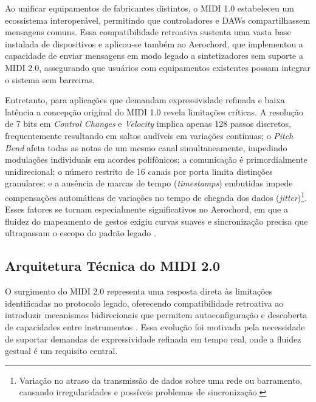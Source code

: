 Ao unificar equipamentos de fabricantes distintos, o MIDI 1.0 estabeleceu um ecossistema interoperável, permitindo que controladores e DAWs compartilhassem mensagens comuns. Essa compatibilidade retroativa sustenta uma vasta base instalada de dispositivos e aplicou-se também ao Aerochord, que implementou a capacidade de enviar mensagens em modo legado a sintetizadores sem suporte a MIDI 2.0, assegurando que usuários com equipamentos existentes possam integrar o sistema sem barreiras.

Entretanto, para aplicações que demandam expressividade refinada e baixa latência a concepção original do MIDI 1.0 revela limitações críticas. A resolução de 7 bits em \textit{Control Changes} e \textit{Velocity} implica apenas 128 passos discretos, frequentemente resultando em saltos audíveis em variações contínuas; o \textit{Pitch Bend} afeta todas as notas de um mesmo canal simultaneamente, impedindo modulações individuais em acordes polifônicos; a comunicação é primordialmente unidirecional; o número restrito de 16 canais por porta limita distinções granulares; e a ausência de marcas de tempo (\textit{timestamps}) embutidas impede compensações automáticas de variações no tempo de chegada dos dados (\textit{jitter})\footnote{Variação no atraso da transmissão de dados sobre uma rede ou barramento, causando irregularidades e possíveis problemas de sincronização.}. Esses fatores se tornam especialmente significativos no Aerochord, em que a fluidez do mapeamento de gestos exigiu curvas suaves e sincronização precisa que ultrapassam o escopo do padrão legado \cite{MIDI2Overview2023}.

\subsection{Arquitetura Técnica do MIDI 2.0}
O surgimento do MIDI 2.0 representa uma resposta direta às limitações identificadas no protocolo legado, oferecendo compatibilidade retroativa ao introduzir mecanismos bidirecionais que permitem autoconfiguração e descoberta de capacidades entre instrumentos \cite{MIDI2Overview2023}. Essa evolução foi motivada pela necessidade de suportar demandas de expressividade refinada em tempo real, onde a fluidez gestual é um requisito central.

